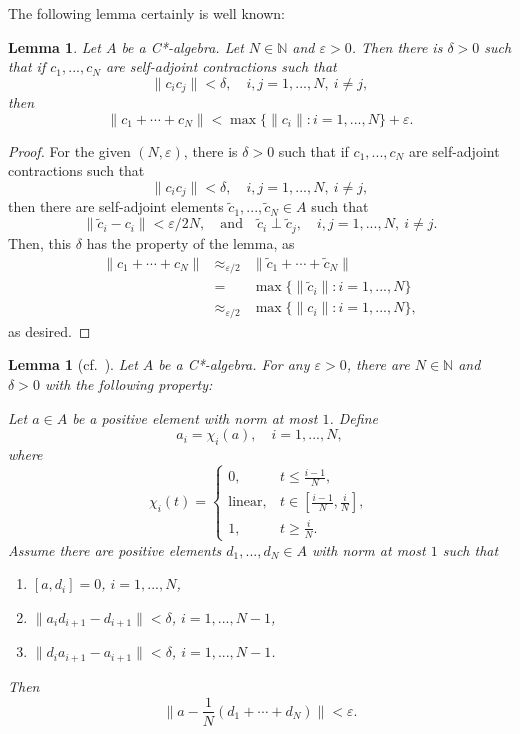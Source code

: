 \documentclass[12pt, oneside, psamsfonts]{amsart}
\newtheorem{lem}[thm]{Lemma}
\theoremstyle{definition}
\theoremstyle{remark}
\numberwithin{equation}{section}
\newcommand{\norm}[1]{\| #1\|}
\newcommand{\eps}{\varepsilon}
\begin{document}
The following lemma certainly is well known:
\begin{lem}\label{pert-almost-ortho}
Let $A$ be a C*-algebra. Let $N \in \mathbb N$ and $\eps>0$. Then there is $\delta>0$ such that if $c_1, ..., c_N$ are self-adjoint contractions such that $$ \norm{c_i c_j} < \delta,\quad i, j =1, ..., N,\ i\neq j,$$
then
$$\norm{c_1 + \cdots + c_N} < \max\{\norm{c_i}: i=1, ..., N\} + \eps.$$
\end{lem}

\begin{proof}
For the given $(N, \eps)$, there is $\delta>0$ such that if $c_1, ..., c_N$ are self-adjoint contractions such that $$ \norm{c_i c_j} < \delta,\quad i, j =1, ..., N,\ i\neq j,$$
then there are self-adjoint elements $\tilde{c}_1, ..., \tilde{c}_N \in A$ such that
$$ \norm{\tilde{c}_i - c_i} < \eps/2N, \quad \textrm{and} \quad \tilde{c}_i \perp \tilde{c}_j,\quad i, j = 1, ..., N,\  i\neq j.$$
Then, this $\delta$ has the property of the lemma, as
\begin{eqnarray*}
\norm{c_1 + \cdots + c_N} & \approx_{\eps/2} & \norm{\tilde{c}_1 + \cdots + \tilde{c}_N} \\
& = & \max\{\norm{\tilde{c}_i}: i=1, ..., N\} \\
& \approx_{\eps/2} & \max\{\norm{c_i}: i=1, ..., N\},
\end{eqnarray*}
as desired.
\end{proof}

\begin{lem}[cf.~\cite{CE-str1}]\label{hereditary-sets-norm-app}
Let $A$ be a C*-algebra. For any $\eps>0$, there are $N \in \mathbb N$ and $\delta>0$ with the following property:

Let $a \in A$ be a positive element with norm at most $1$. Define $$a_i = \chi_i(a),\quad  i=1, ..., N, $$ where $$\chi_i(t) = \left\{ 
\begin{array}{ll}
0, & t \leq \frac{i-1}{N}, \\
\mathrm{linear}, & t \in [\frac{i-1}{N}, \frac{i}{N}], \\
1, & t \geq \frac{i}{N}.
\end{array} 
\right.
$$
Assume there are positive elements $d_1, ..., d_N\in A$  with norm at most $1$ such that
         \begin{enumerate}
         \item\label{commut-cond} $[a, d_i] = 0$, $i=1, ..., N$,
         \item\label{here-cond-1-a} $ \norm{a_{i} d_{i+1} - d_{i+1}} < \delta$, $i=1, ..., N-1$,
         \item\label{here-cond-1-b} $ \norm{d_i a_{i+1} - a_{i+1}} < \delta$, $i=1, ..., N-1$.
         \end{enumerate} 
        Then
        $$\norm{ a  - \frac{1}{N}(d_1 + \cdots + d_N)} <  \eps.$$
\end{lem}
\end{document}
